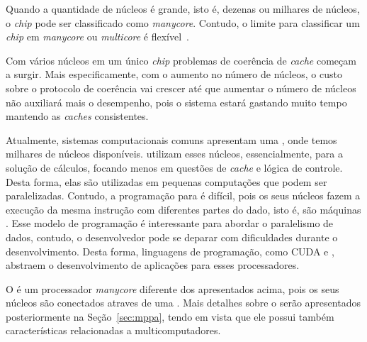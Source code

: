Quando a quantidade de núcleos é grande, isto é, dezenas ou milhares de
núcleos, o \textit{chip} pode ser classificado como \textit{manycore}.
Contudo, o limite para classificar um \textit{chip} em \textit{manycore} ou
\textit{multicore} é flexível~\cite{Tanenbaum2015}.

Com vários núcleos em um único \textit{chip} problemas de coerência de
\textit{cache} começam a surgir. Mais especificamente, com o aumento no número
de núcleos, o custo sobre o protocolo de coerência vai crescer até que
aumentar o número de núcleos não auxiliará mais o desempenho, pois o sistema
estará gastando muito tempo mantendo as \textit{caches} consistentes.


Atualmente, sistemas computacionais comuns apresentam uma \gpu, onde temos
milhares de núcleos disponíveis. \gpus utilizam esses núcleos,
essencialmente, para a solução de cálculos, focando menos em questões de
\textit{cache} e lógica de controle. Desta forma, elas são utilizadas em
pequenas computações que podem ser paralelizadas. Contudo, a programação para
\gpus é difícil, pois os seus núcleos fazem a execução da mesma instrução
com diferentes partes do dado, isto é, são máquinas \simd. Esse modelo de
programação é interessante para abordar o paralelismo de dados, contudo, o
desenvolvedor pode se deparar com dificuldades durante o desenvolvimento.
Desta forma, linguagens de programação, como CUDA e \opencl,
abstraem o desenvolvimento de aplicações para esses processadores.

O \mppa é um processador \textit{manycore} diferente dos apresentados acima,
pois os seus núcleos são conectados atraves de uma \noc. Mais detalhes
sobre o \mppa serão apresentados posteriormente na Seção~\ref{sec:mppa}, tendo
em vista que ele possui também características relacionadas a multicomputadores.

